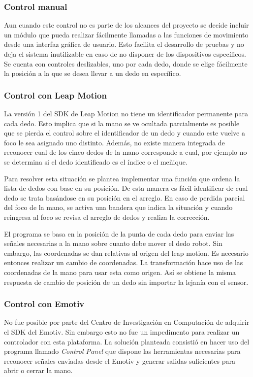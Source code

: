 \documentclass[letterpaper,journal,transmag]{IEEEtran}
\begin{document}
\subsubsection{Control manual}
Aun cuando este control no es parte de los alcances del proyecto se decide
incluir un módulo que pueda realizar fácilmente llamadas a las funciones de
movimiento desde una interfaz gráfica de usuario. Esto facilita el desarrollo
de pruebas y no deja el sistema inutilizable en caso de no disponer de los
dispositivos específicos. Se cuenta con controles deslizables, uno por cada
dedo, donde se elige fácilmente la posición a la que se desea llevar a un dedo
en específico.\\

\subsubsection{Control con Leap Motion}
La versión 1 del SDK de Leap Motion no tiene un identificador permanente para
cada dedo. Esto implica que si la mano se ve ocultada parcialmente es posible
que se pierda el control sobre el identificador de un dedo y cuando este vuelve
a foco le sea asignado uno distinto. Además, no existe manera integrada de
reconocer cual de los cinco dedos de la mano corresponde a cual, por ejemplo no
se determina si el dedo identificado es el índice o el meñique.

Para resolver esta situación se plantea implementar una función que ordena la
lista de dedos con base en su posición. De esta manera es fácil identificar
de cual dedo se trata basándose en su posición en el arreglo. En caso de
perdida parcial del foco de la mano, se activa una bandera que indica la
situación y cuando reingresa al foco se revisa el arreglo de dedos y realiza la
corrección.

El programa se basa en la posición de la punta de cada dedo para enviar las
señales necesarias a la mano sobre cuanto debe mover el dedo robot. Sin
embargo, las coordenadas se dan relativas al origen del leap motion. Es
necesario entonces realizar un cambio de coordenadas. La transformación hace
uso de las coordenadas de la mano para usar esta como origen. Así se obtiene la
misma respuesta de cambio de posición de un dedo sin importar la lejanía con el
sensor.\\

\subsubsection{Control con Emotiv}
No fue posible por parte del Centro de Investigación en Computación de adquirir
el SDK del Emotiv. Sin embargo esto no fue un impedimento para realizar un
controlador con esta plataforma. La solución planteada consistió en hacer uso
del programa llamado \emph{Control Panel} que dispone las herramientas
necesarias para reconocer señales enviadas desde el Emotiv y generar salidas
suficientes para abrir o cerrar la mano.
\end{document}

